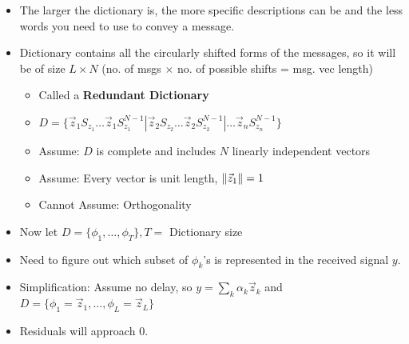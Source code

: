 \documentclass{article}\usepackage{amsmath,amssymb,amsthm,tikz,tkz-graph,color,chngpage,soul,hyperref,csquotes,graphicx,floatrow,framed,scrextend,mathtools,mathrsfs}\newcommand*{\QEDB}{\hfill\ensuremath{\square}}\newtheorem*{prop}{Proposition}\renewcommand{\theenumi}{\alph{enumi}}\usepackage[shortlabels]{enumitem}\usepackage[nobreak=true]{mdframed}\usetikzlibrary{matrix,calc}\MakeOuterQuote{"}\usepackage[margin=0.75in]{geometry} \newtheorem{theorem}{Theorem}\newcommand{\Z}{\mathbb Z}\newcommand{\R}{\mathbb R}\newcommand{\Q}{\mathbb Q}\newcommand{\N}{\mathbb N}\newcommand{\x}[1]{\textrm{#1}}\newcommand{\xs}[1]{\textrm{ #1 }}\newcommand{\pr}{\textrm{Pr}}
\newcommand{\sumlim}[3]{\sum\limits_{#1}^{#2}#3}
\newcommand{\set}[1]{\{#1\}}
\DeclarePairedDelimiter{\norm}{\lVert}{\rVert}
\newcommand{\items}[1]{\begin{itemize}#1\end{itemize}}
\begin{document}
\items{
    \item The larger the dictionary is, the more specific descriptions can be and the less words you need to use to convey a message.
    \item Dictionary contains all the circularly shifted forms of the messages, so it will be of size $L\times N$ (no. of msgs $\times$ no. of possible shifts = msg. vec length)
    \items{
        \item Called a \textbf{Redundant Dictionary}
        \item $D=\set{\vec{z}_1S_{z_1}\ldots\vec{z}_1S^{N-1}_{z_1}|\vec{z}_2S_{z_2}\ldots\vec{z}_2S^{N-1}_{z_2}|\ldots\vec{z}_nS^{N-1}_{z_n}}$
        \item Assume: $D$ is complete and includes $N$ linearly independent vectors
        \item Assume: Every vector is unit length, $\norm{\vec{z}_1}=1$
        \item Cannot Assume: Orthogonality
    }
    \item Now let $D=\set{\phi_1,\ldots,\phi_T}, T=$ Dictionary size
    \item Need to figure out which subset of $\phi_k$'s is represented in the received signal $y$.
    \item Simplification: Assume no delay, so $y=\sumlim{k}{}{\alpha_k\vec{z}_k}$ and $D=\set{\phi_1=\vec{z}_1,\ldots,\phi_L=\vec{z}_L}$
    \item Residuals will approach 0.
}
\end{document}
